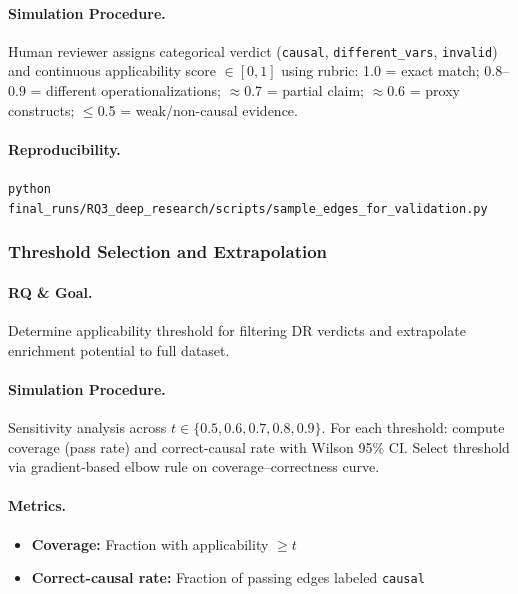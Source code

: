 \paragraph{Simulation Procedure.}
Human reviewer assigns categorical verdict (\texttt{causal}, \texttt{different\_vars}, \texttt{invalid}) and continuous applicability score $\in[0,1]$ using rubric: 1.0 = exact match; 0.8--0.9 = different operationalizations; $\approx$0.7 = partial claim; $\approx$0.6 = proxy constructs; $\leq$0.5 = weak/non-causal evidence.

\paragraph{Reproducibility.}
\texttt{python final\_runs/RQ3\_deep\_research/scripts/sample\_edges\_for\_validation.py}

\subsubsection{Threshold Selection and Extrapolation}
\label{sec:rq3_threshold_selection}

\paragraph{RQ \& Goal.}
Determine applicability threshold for filtering DR verdicts and extrapolate enrichment potential to full dataset.

\paragraph{Simulation Procedure.}
Sensitivity analysis across $t \in \{0.5, 0.6, 0.7, 0.8, 0.9\}$. For each threshold: compute coverage (pass rate) and correct-causal rate with Wilson 95\% CI. Select threshold via gradient-based elbow rule on coverage--correctness curve.

\paragraph{Metrics.}
\begin{itemize}[noitemsep]
    \item \textbf{Coverage:} Fraction with applicability $\geq t$
    \item \textbf{Correct-causal rate:} Fraction of passing edges labeled \texttt{causal}
\end{itemize}

